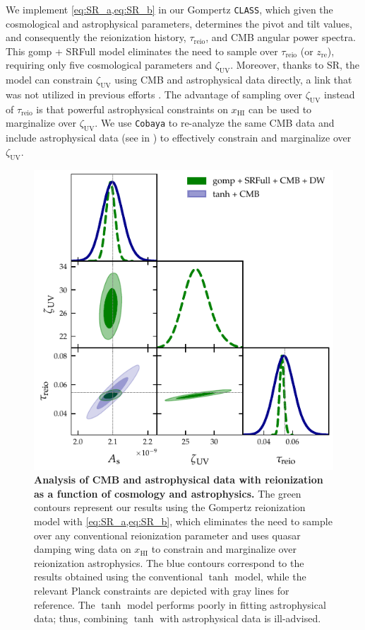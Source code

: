 \documentclass[12pt, a4paper]{article}
\newcommand{\zetaUV}{\zeta_\mathrm{UV}}
\newcommand{\HI}{\mathrm{HI}}
\newcommand{\re}{\mathrm{re}}
\newcommand{\reio}{\mathrm{reio}}
\begin{document}
We implement \cref{eq:SR_a,eq:SR_b} in our Gompertz \texttt{CLASS},
which given the cosmological and astrophysical parameters, determines
the pivot and tilt values, and consequently the reionization history,
$\tau_\reio$, and CMB angular power spectra.
This gomp + SRFull model eliminates the need to sample over $\tau_\reio$
(or $z_\re$), requiring only five cosmological parameters and $\zetaUV$.
Moreover, thanks to SR, the model can constrain $\zetaUV$ using CMB and
astrophysical data directly, a link that was not utilized in
previous efforts \cite{Greig2017}.
The advantage of sampling over $\zetaUV$ instead of $\tau_\reio$ is that
powerful astrophysical constraints on $x_\HI$ can be used to marginalize
over $\zetaUV$.
We use \texttt{Cobaya} to re-analyze the same CMB data and include
astrophysical data (see  in ) to
effectively constrain and marginalize over $\zetaUV$.

\begin{figure}[tb]
\centering
\includegraphics[width=0.7\linewidth]{figs/gomp1dw_tanh_triangle_kill.pdf}
\caption{\textbf{Analysis of CMB and astrophysical data with
reionization as a function of cosmology and astrophysics.}
The green contours represent our results using the Gompertz reionization
model with \cref{eq:SR_a,eq:SR_b}, which eliminates the need to sample
over any conventional reionization parameter and uses quasar damping
wing data on $x_\HI$ to constrain and marginalize over reionization
astrophysics.
The blue contours correspond to the results obtained using the
conventional $\tanh$ model, while the relevant Planck constraints
\cite{Planck2020a} are depicted with gray lines for reference.
The $\tanh$ model performs poorly in fitting astrophysical data; thus,
combining $\tanh$ with astrophysical data is ill-advised.}
\label{fig:kill}
\end{figure}
\end{document}
